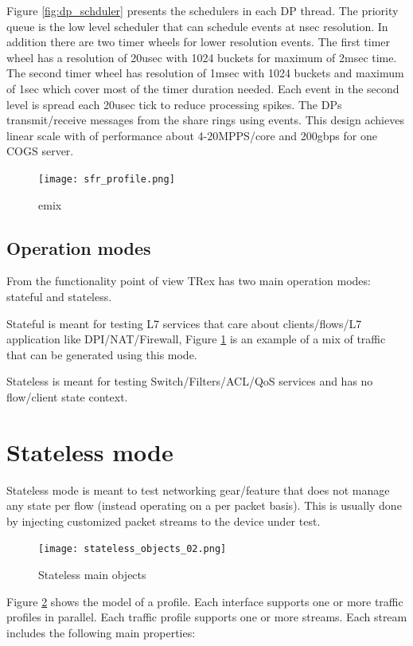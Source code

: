 \documentclass[letterpaper]{article}
\begin{document}
Figure \ref{fig:dp_schduler} presents the schedulers in each DP thread. The priority queue is the low level scheduler that can schedule events at nsec resolution. In addition there are two timer wheels for lower resolution events. The first timer wheel has a resolution of 20usec with 1024 buckets for maximum of 2msec time. 
The second timer wheel has resolution of 1msec with 1024 buckets and maximum of 1sec which cover most of the timer duration needed. Each event in the second level is spread each 20usec tick to reduce processing spikes. 
The DPs transmit/receive messages from the share rings using events. 
This design achieves linear scale with of performance about 4-20MPPS/core and 200gbps for one COGS server. 

\begin{figure}[h]
\texttt{[image: sfr\_profile.png]}
\caption{emix}
\label{fig:emix}
\end{figure}

\subsection{Operation modes}

From the functionality point of view TRex has two main operation modes: stateful and stateless. 

Stateful is meant for testing L7 services that care about clients/flows/L7 application like DPI/NAT/Firewall, Figure \ref{fig:emix} is an example of a mix of traffic that can be generated using this mode. 

Stateless is meant for testing Switch/Filters/ACL/QoS services and has no flow/client state context.

\section{Stateless mode}

Stateless mode is meant to test networking gear/feature that does not manage any state per flow (instead operating on a per packet basis). 
This is usually done by injecting customized packet streams to the device under test.

\begin{figure}[h]
\texttt{[image: stateless\_objects\_02.png]}
\caption{Stateless main objects}
\label{fig:stlobjects}
\end{figure}

Figure \ref{fig:stlobjects} shows the model of a profile. Each interface supports one or more traffic profiles in parallel.
Each traffic profile supports one or more streams. Each stream includes the following main properties:
\end{document}
